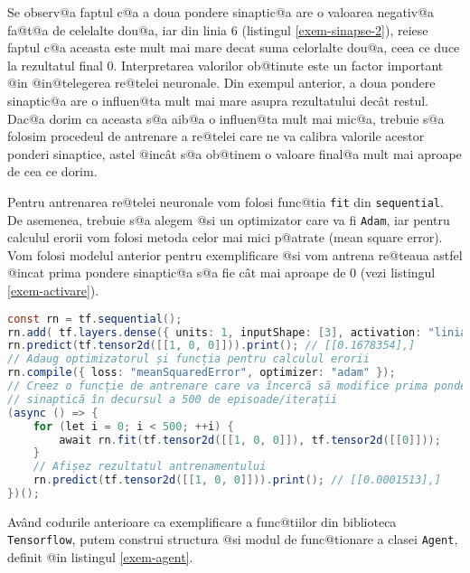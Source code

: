 Se observ@a faptul c@a a doua pondere sinaptic@a are o valoarea negativ@a fa@t@a de celelalte dou@a, iar din linia 6 (listingul \ref{exem-sinapse-2}), reiese faptul c@a aceasta este mult mai mare decat suma celorlalte dou@a, ceea ce duce la rezultatul final 0. Interpretarea valorilor ob@tinute este un factor important @in @in@telegerea re@telei neuronale. Din exempul anterior, a doua pondere sinaptic@a are o influen@ta mult mai mare asupra rezultatului dec\^ at restul. Dac@a dorim ca aceasta s@a aib@a o influen@ta mult mai mic@a, trebuie s@a folosim procedeul de antrenare a re@telei care ne va calibra valorile acestor ponderi sinaptice, astel @inc\^ at s@a ob@tinem o valoare final@a mult mai aproape de cea ce dorim.

Pentru antrenarea re@telei neuronale vom folosi func@tia \texttt{fit} din \texttt{sequential}. De asemenea, trebuie s@a alegem @si un optimizator care va fi \texttt{Adam}, iar pentru calculul erorii vom folosi metoda celor mai mici p@atrate (mean square error). Vom folosi modelul anterior pentru exemplificare @si vom antrena re@teaua astfel @incat prima pondere sinaptic@a s@a fie c\^ at mai aproape de 0 (vezi listingul \ref{exem-activare}).

\begin{lstlisting}[language=Java, caption={Exemplu de antrenare a unei simple rețele neuronale cu funcție de activare}, label={exem-activare}]
const rn = tf.sequential();
rn.add( tf.layers.dense({ units: 1, inputShape: [3], activation: "liniar", useBias: false }) );
rn.predict(tf.tensor2d([[1, 0, 0]])).print(); // [[0.1678354],] 
// Adaug optimizatorul și funcția pentru calculul erorii
rn.compile({ loss: "meanSquaredError", optimizer: "adam" });
// Creez o funcție de antrenare care va încercă să modifice prima pondere 
// sinaptică în decursul a 500 de episoade/iterații
(async () => {
	for (let i = 0; i < 500; ++i) {
		await rn.fit(tf.tensor2d([[1, 0, 0]]), tf.tensor2d([[0]]));
	}
	// Afișez rezultatul antrenamentului
	rn.predict(tf.tensor2d([[1, 0, 0]])).print(); // [[0.0001513],]
})();
\end{lstlisting}

Av\^ and codurile anterioare ca exemplificare a func@tiilor din biblioteca \texttt{Tensorflow}, putem construi structura @si modul de func@tionare a clasei \texttt{Agent}, definit @in listingul \ref{exem-agent}.

